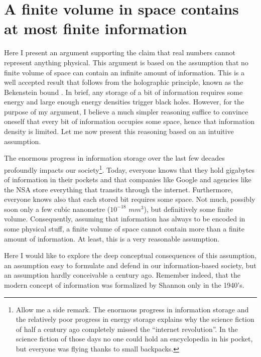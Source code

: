 \documentclass[pra,aps,groupedaddress,twocolumn,floatfix,nofootinbib]{revtex4}
\begin{document}
\section{A finite volume in space contains at most finite information}\label{finiteInfo}
Here I present an argument supporting the claim that real numbers cannot represent anything physical. This argument is based on the assumption that no finite volume of space can contain an infinite amount of information. This is a well accepted result that follows from the holographic principle, known as the Bekenstein bound \cite{HoloPrinciple,BekensteinBound}. In brief, any storage of a bit of information requires some energy and large enough energy densities trigger black holes. However, for the purpose of my argument, I believe a much simpler reasoning suffice to convince oneself that every bit of information occupies some space, hence that information density is limited. Let me now present this reasoning based on an intuitive assumption.

The enormous progress in information storage over the last few decades profoundly impacts our society\footnote{Allow me a side remark. The enormous progress in information storage and the relatively poor progress in energy storage explains why the science fiction of half a century ago completely missed the ``internet revolution''. In the science fiction of those days no one could hold an encyclopedia in his pocket, but everyone was flying thanks to small backpacks.}. Today, everyone knows that they hold gigabytes of information in their pockets and that companies like Google and agencies like the NSA store everything that transits through the internet. Furthermore, everyone knows also that each stored bit requires some space. Not much, possibly soon only a few cubic nanometre ($10^{-18}$ $mm^3$), but definitively some finite volume. Consequently, assuming that information has always to be encoded in some physical stuff, a finite volume of space cannot contain more than a finite amount of information. At least, this is a very reasonable assumption.

Here I would like to explore the deep conceptual consequences of this assumption, an assumption easy to formulate and defend in our information-based society, but an assumption hardly conceivable a century ago. Remember indeed, that the modern concept of information was formalized by Shannon only in the 1940's.%
\end{document}
